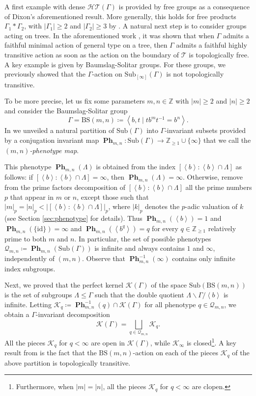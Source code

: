 \documentclass[12pt]{article}
\numberwithin{equation}{section}
\theoremstyle{definition}
\newcommand{\Z}{\mathbb{Z}}
\newcommand{\inv}{^{-1}}
\newcommand{\la}{\left\langle}
\newcommand{\ra}{\right\rangle}
\newcommand{\abs}[1]{\left\lvert #1\right\rvert}
\newcommand{\PK}{\mathcal{K}}
\newcommand{\QQ}{\mathcal{Q}}
\def\id{\mathrm{id}}
\newcommand\BSo{\mathrm{BS}}
\DeclareMathOperator\PHE{\mathbf{Ph}}
\newcommand{\Sub}{\mathrm{Sub}}
\newcommand\Tree{\mathcal{T}}
\newcommand{\bs}{\backslash}
\begin{document}
A first example with dense \(\mathcal{HT}(\Gamma)\) is provided by free groups as a consequence of Dixon's aforementioned result.
More generally, this holds for free products \(\Gamma_1*\Gamma_2\), 
with \(\abs{\Gamma_1}\geq 2\) and \(\abs{\Gamma_2}\geq 3\) by \cite[Thm.~10.30]{le_maitre_polish_2024}.
A natural next step is to consider groups acting on trees.
In the aforementioned work \cite{fima_characterization_HT_2022}, it was shown that when 
$\Gamma$ admits a faithful minimal action of general type on a tree,  then
$\Gamma$ admits a faithful highly transitive action as soon as the action on the boundary of \(\Tree\)
is topologically free. A key example is given by Baumslag-Solitar groups.
For these groups, we previously showed that the \( \Gamma \)-action  on \(\Sub_{[\infty]}(\Gamma)\) is not topologically transitive.


To be more precise, let us fix some parameters $m,n\in\Z$ with \(\abs{m}\geq 2\) and \(\abs{n}\geq 2\) and consider the Baumslag-Solitar group 
\[\Gamma=\BSo(m,n) \coloneqq \la b,t\mid t b^m t^{-1}=b^n\ra.\]
In \cite{CGLMS-22} we unveiled a natural partition of \(\Sub(\Gamma)\) 
into \(\Gamma\)-invariant subsets provided by a
conjugation invariant map
\(\PHE_{m,n}:\Sub(\Gamma)\to \Z_{\geq 1}\cup\{\infty\}\) 
that we call the  \emph{$(m,n)$-phenotype map}. 



This phenotype $\PHE_{m,n}(\Lambda)$ is obtained from the index $[\la b\ra : \la b\ra \cap \Lambda]$ as follows: 
 if $[\la b\ra : \la b\ra \cap \Lambda]=\infty$, then $\PHE_{m,n}(\Lambda)=\infty$. Otherwise, remove from the prime factors decomposition of $[\la b\ra : \la b\ra \cap \Lambda]$
 all the prime numbers $p$ that appear in $m$ or $n$, 
 except those such that $\abs{m}_p=\abs{n}_p<\abs{[\la b\ra : \la b\ra \cap \Lambda]}_p$, 
 where $\abs{k}_p$ denotes the $p$-adic valuation of $k$
 (see Section \ref{sec:phenotype} for details).
 Thus $\PHE_{m,n}(\la b \ra)=1$ and $ \PHE_{m,n}(\{\id\})=\infty$ and 
 $\PHE_{m,n}(\la b^q \ra)=q$ for every $q\in\Z_{\geq 1}$ relatively prime to both \(m\) and \(n\). 
 In particular, the set of possible phenotypes
 \(\QQ_{m,n}\coloneqq \PHE_{m,n}(\Sub(\Gamma))\) is 
 infinite and always contains $1$ and $\infty$, independently of $(m,n)$.
 Observe that $\PHE_{m,n}\inv(\infty)$ contains only infinite index subgroups. 
 


Next, we proved that the perfect kernel $\PK(\Gamma)$ 
of the space $\Sub(\BSo(m,n))$ is the 
set of subgroups $\Lambda\leq\Gamma$
such that the double quotient  $\Lambda\bs\Gamma/\la b\ra$ is infinite.
Letting \(\PK_q\coloneqq \PHE_{m,n}\inv(q)\cap \PK(\Gamma)\) for all phenotype \(q\in\mathcal Q_{m,n}\),
we obtain a \(\Gamma\)-invariant decomposition 
\[
\PK(\Gamma)= \bigsqcup_{q\in\mathcal Q_{m,n}} \PK_q.
\]
All the pieces \(\PK_q\) for \(q<\infty\) are open in \(\PK(\Gamma)\),
while \(\PK_\infty\) is closed\footnote{Furthermore, when \(\abs m=\abs n\),
all the pieces \(\PK_q\) for \(q<\infty\) are clopen.}.
A key result from \cite{CGLMS-22} is the fact that the \(\BSo(m,n)\)-action
on each of the pieces \(\PK_q\) of the above partition is topologically 
transitive.
\end{document}
